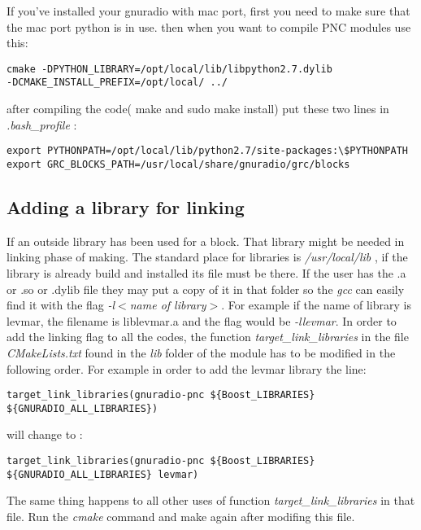 If you've installed your gnuradio with mac port, first you need to make sure that the mac port python is in use. then when you want to compile PNC modules use this:
\begin{footnotesize}
\begin{lstlisting}
cmake -DPYTHON_LIBRARY=/opt/local/lib/libpython2.7.dylib
-DCMAKE_INSTALL_PREFIX=/opt/local/ ../
\end{lstlisting}
\end{footnotesize}
after compiling the code( make and sudo make install) put these two lines in \textit{.bash\_profile} :
\begin{footnotesize}
\begin{lstlisting}
export PYTHONPATH=/opt/local/lib/python2.7/site-packages:\$PYTHONPATH
export GRC_BLOCKS_PATH=/usr/local/share/gnuradio/grc/blocks
\end{lstlisting}
\end{footnotesize}

\subsection{Adding a library for linking}

If an outside library has been used for a block. That library might be needed in linking phase of making. The standard place for libraries is \textit{/usr/local/lib} , if the library is already build and installed its file must be there. If the user has the .a or .so or .dylib file they may put a copy of it in that folder so the \textit{gcc} can easily find it with the flag \textit{-l$<$name of library$>$}. For example if the name of library is levmar, the filename is liblevmar.a and the flag would be \textit{-llevmar}. In order to add the linking flag to all the codes, the function \textit{target\_link\_libraries} in the file \textit{CMakeLists.txt} found in the \textit{lib} folder of the module has to be modified in the following order. For example in order to add the levmar library the line:
\begin{footnotesize}
\begin{lstlisting}
target_link_libraries(gnuradio-pnc ${Boost_LIBRARIES} ${GNURADIO_ALL_LIBRARIES})
\end{lstlisting}
\end{footnotesize}

will change to :
\begin{footnotesize}
\begin{lstlisting}
target_link_libraries(gnuradio-pnc ${Boost_LIBRARIES} ${GNURADIO_ALL_LIBRARIES} levmar)
\end{lstlisting}
\end{footnotesize}
The same thing happens to all other uses of function \textit{target\_link\_libraries} in that file. Run the \textit{cmake} command and make again after modifing this file.


